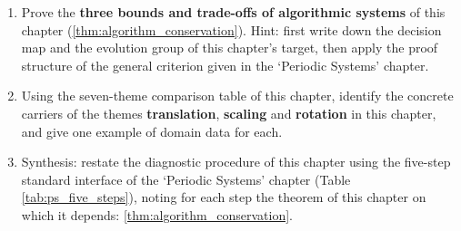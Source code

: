 \begin{enumerate}[leftmargin=3em, label=\textbf{Exercise \arabic*}]
    \item Prove the \textbf{three bounds and trade-offs of algorithmic systems} of this chapter (\ref{thm:algorithm_conservation}). Hint: first write down the decision map and the evolution group of this chapter's target, then apply the proof structure of the general criterion given in the `Periodic Systems' chapter.

    \item Using the seven-theme comparison table of this chapter, identify the concrete carriers of the themes \textbf{translation}, \textbf{scaling} and \textbf{rotation} in this chapter, and give one example of domain data for each.

    \item Synthesis: restate the diagnostic procedure of this chapter using the five-step standard interface of the `Periodic Systems' chapter (Table \ref{tab:ps_five_steps}), noting for each step the theorem of this chapter on which it depends: \ref{thm:algorithm_conservation}.
\end{enumerate}
